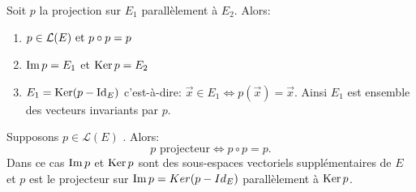 \documentclass{book}
\begin{document}
\begin{Proposition}[Propriétés] Soit $p$ la projection sur $E_1$ parallèlement à $E_2$. Alors:
\begin{enumerate}
\item $p \in   \mathcal{L}(E)\text{ et }p \circ p = p$
\item $\operatorname{Im} p = E_1$ et $\operatorname{Ker} p = E_2$
\item $E_1 = \operatorname{Ker}(p - \mathrm{Id}_E)$ c'est-à-dire: $\vec{ x }\in   E_1 \Leftrightarrow p(\vec{x}) = \vec{x}.$ Ainsi $E_1$ est ensemble des vecteurs invariants par $p$.
\end{enumerate}
\end{Proposition}
\begin{Proposition}[Caractérisation] Supposons $p \in   \mathcal{L}(E)$ . Alors:
$$p\text{ projecteur} \Leftrightarrow p \circ p = p.$$
Dans ce cas $\operatorname{Im} p$ et $\operatorname{Ker} p$ sont des sous-espaces vectoriels supplémentaires de $E$ et $p$ est le projecteur sur $\operatorname{Im} p =
Ker(p - Id_E)$ parallèlement à $\operatorname{Ker} p$.
\end{Proposition}
%
%
%
%
\end{document}

